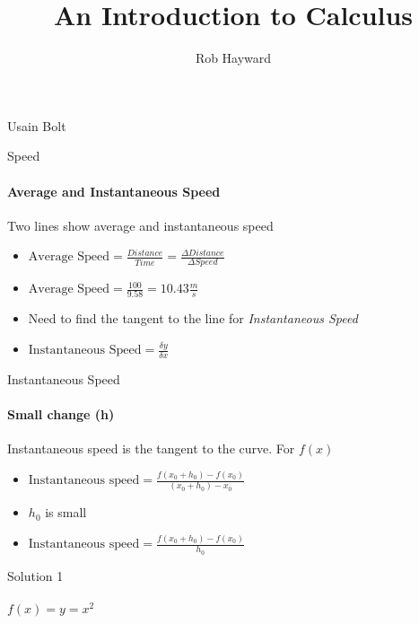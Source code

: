 \documentclass[14pt,xcolor=pdftex,dvipsnames,table, handout]{beamer}
\title{An Introduction to Calculus}
\author{Rob Hayward}
\date{}
\begin{document}
\begin{frame}
\titlepage
\end{frame}


\begin{frame}{Usain Bolt}
\end{frame}

\begin{frame}{Speed}
\framesubtitle{Average and Instantaneous Speed}
Two lines show average and instantaneous speed
\pause
\begin{itemize}[<+-| alert@+>]
\item $\text{Average Speed} = \frac{Distance}{Time} = \frac{\Delta Distance}{\Delta Speed}$
\item $\text{Average Speed} = \frac{100}{9.58} = 10.43\frac{m}{s}$
\item Need to find the tangent to the line for \emph{Instantaneous Speed}
\item $\text{Instantaneous Speed} = \frac{\delta y}{\delta x}$
\end{itemize}
\end{frame}

\begin{frame}{Instantaneous Speed}
\framesubtitle{Small change (h)}
Instantaneous speed is the tangent to the curve.  For $f(x)$
\pause
\begin{itemize}[<+-| alert@+>]
\item $\text{Instantaneous speed} = \frac{f(x_0 + h_0) - f(x_0)}{(x_0 +h_0) - 
x_0}$ 
\item $h_0$ is small
\item $\text{Instantaneous speed} = \frac{f(x_0 + h_0) - f(x_0)}{h_0}$
\end{itemize}
\end{frame}

\begin{frame}{Solution 1}
\framesubtitle{$f(x) = y = x^2$}
\end{frame}
\end{document}
